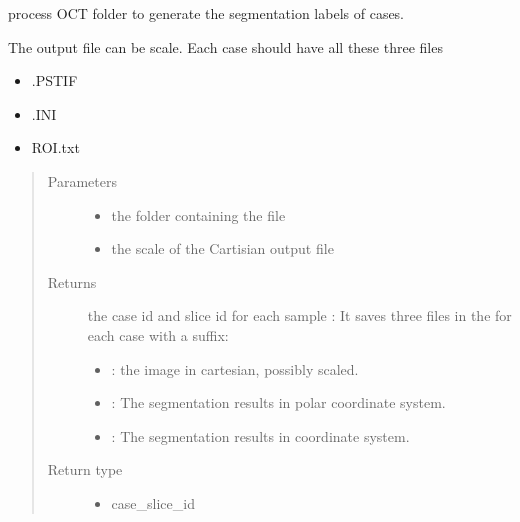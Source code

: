 \documentclass[letterpaper,10pt,english]{sphinxmanual}
\begin{document}
\begin{fulllineitems}
\label{\detokenize{index:util.process_oct_folder.process_oct_folder}}
process OCT folder to generate the segmentation labels of cases.

The  output file can be scale.  Each case should have all these three files
\begin{itemize}
\item {} 
.PSTIF

\item {} 
.INI

\item {} 
ROI.txt

\end{itemize}
\begin{quote}\begin{description}
\item[{Parameters}] \leavevmode\begin{itemize}
\item {} 
 \textendash{} the folder containing the file

\item {} 
 \textendash{} the scale of the Cartisian output file

\end{itemize}

\item[{Returns}] \leavevmode

the case id and slice id for each sample
: It saves three files in the  for each case with a suffix:
\begin{itemize}
\item {} 
: the image in cartesian, possibly scaled.

\item {} 
: The segmentation results in polar coordinate system.

\item {} 
: The segmentation results in  coordinate system.

\end{itemize}


\item[{Return type}] \leavevmode
\begin{itemize}
\item {} 
case\_slice\_id


\end{itemize}
\end{description}
\end{quote}
\end{fulllineitems}
\end{document}
